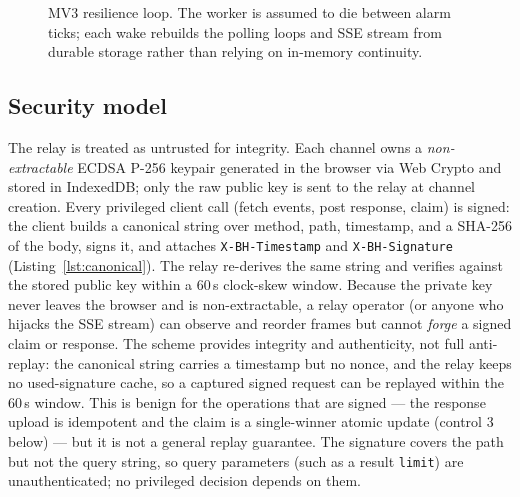 \documentclass[11pt]{article}
\begin{document}
\begin{figure}[t]
\centering
{}
\caption{MV3 resilience loop. The worker is assumed to die between alarm ticks;
each wake rebuilds the polling loops and SSE stream from durable storage rather
than relying on in-memory continuity.}
\label{fig:mv3}
\end{figure}

\subsection{Security model}
\label{sec:security}

The relay is treated as untrusted for integrity. Each channel owns a
\emph{non-extractable} ECDSA P-256 keypair generated in the browser via Web
Crypto and stored in IndexedDB; only the raw public key is sent to the relay at
channel creation. Every privileged client call (fetch events, post response,
claim) is signed: the client builds a canonical string over method, path,
timestamp, and a SHA-256 of the body, signs it, and attaches
\texttt{X-BH-Timestamp} and \texttt{X-BH-Signature}
(Listing~\ref{lst:canonical}). The relay re-derives the same string and
verifies against the stored public key within a 60\,s clock-skew window.
Because the private key never leaves the browser and is non-extractable, a
relay operator (or anyone who hijacks the SSE stream) can observe and reorder
frames but cannot \emph{forge} a signed claim or response. The scheme provides
integrity and authenticity, not full anti-replay: the canonical string carries
a timestamp but no nonce, and the relay keeps no used-signature cache, so a
captured signed request can be replayed within the 60\,s window. This is benign
for the operations that are signed --- the response upload is idempotent and the
claim is a single-winner atomic update (control 3 below) --- but it is not a
general replay guarantee. The signature covers the path but not the query
string, so query parameters (such as a result \texttt{limit}) are
unauthenticated; no privileged decision depends on them.
\end{document}
